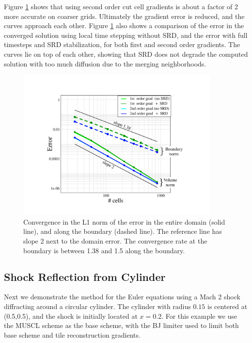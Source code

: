 Figure \ref{fig:ssv} shows that using second order cut cell gradients is about
a factor of 2 more accurate on coarser grids. Ultimately the gradient
error is reduced, and the  curves approach each other. 
Figure \ref{fig:ssv} also shows a comparison of the error in the converged
solution using local time stepping without SRD, and the error with full timesteps and
SRD stabilization, for both first and second order gradients.
The curves lie on top of each other, showing that 
SRD does not degrade the computed solution with too much diffusion due
to the merging neighborhoods.

\begin{figure}
	\begin{center}
		\includegraphics[height=3.0in]{figs/ssvconv.pdf}
		\caption{\sf Convergence in the L1 norm of the error in the entire 
			domain  (solid line), and along the boundary (dashed line).
			The reference line has slope 2 next to the domain error. The convergence
			rate at the boundary is between 1.38 and 1.5
			along the boundary.
			\label{fig:ssv}}
	\end{center}
\end{figure}



\subsection{Shock Reflection from  Cylinder}
Next we demonstrate the method for the Euler equations using a Mach 2
shock diffracting around a circular cylinder. The cylinder with radius $0.15$ is centered at
(0.5,0.5), and the shock is initially located at $x = 0.2$.
For this example we use the MUSCL scheme as the base scheme, with the BJ limiter used to limit
both base scheme and tile reconstruction gradients. 

